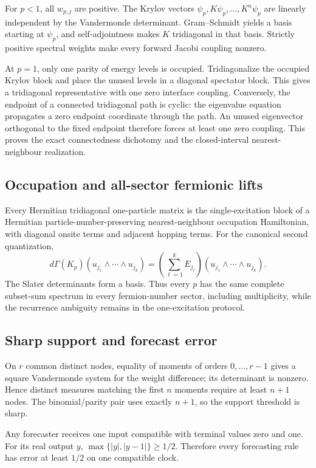 For $p<1$, all $w_{p,j}$ are positive.  The Krylov vectors
$\psi_p,K\psi_p,\ldots,K^n\psi_p$ are linearly independent by the
Vandermonde determinant.  Gram--Schmidt yields a basis starting at
$\psi_p$, and self-adjointness makes $K$ tridiagonal in that basis.
Strictly positive spectral weights make every forward Jacobi coupling
nonzero.

At $p=1$, only one parity of energy levels is occupied.  Tridiagonalize the
occupied Krylov block and place the unused levels in a diagonal spectator
block.  This gives a tridiagonal representative with one zero interface
coupling.  Conversely, the endpoint of a connected tridiagonal path is
cyclic: the eigenvalue equation propagates a zero endpoint coordinate through
the path.  An unused eigenvector orthogonal to the fixed endpoint therefore
forces at least one zero coupling.  This proves the exact connectedness
dichotomy and the closed-interval nearest-neighbour realization.

\subsection{Occupation and all-sector fermionic lifts}

Every Hermitian tridiagonal one-particle matrix is the single-excitation block
of a Hermitian particle-number-preserving nearest-neighbour occupation
Hamiltonian, with diagonal onsite terms and adjacent hopping terms.  For the
canonical second quantization,
\[
 d\Gamma(K_p)(u_{j_1}\wedge\cdots\wedge u_{j_k})
 =\left(\sum_{\ell=1}^kE_{j_\ell}\right)
  (u_{j_1}\wedge\cdots\wedge u_{j_k}).
\]
The Slater determinants form a basis.  Thus every $p$ has the same complete
subset-sum spectrum in every fermion-number sector, including multiplicity,
while the recurrence ambiguity remains in the one-excitation protocol.

\subsection{Sharp support and forecast error}

On $r$ common distinct nodes, equality of moments of orders
$0,\ldots,r-1$ gives a square Vandermonde system for the weight difference;
its determinant is nonzero.  Hence distinct measures matching the first
$n$ moments require at least $n+1$ nodes.  The binomial/parity pair uses
exactly $n+1$, so the support threshold is sharp.

Any forecaster receives one input compatible with terminal values zero and
one.  For its real output $y$,
$\max\{|y|,|y-1|\}\ge1/2$.  Therefore every forecasting rule has error at
least $1/2$ on one compatible clock.

